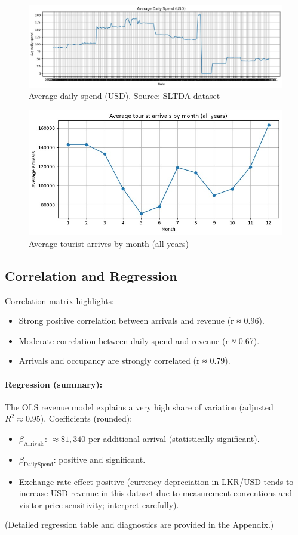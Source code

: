 \documentclass[12pt,a4paper]{article}
\begin{document}
\begin{figure}[H]
  \centering
  \includegraphics[width=0.9\linewidth]{figure3.jpg}
  \caption{Average daily spend (USD). Source: SLTDA dataset}
\end{figure}

\begin{figure}[H]
  \centering
  \includegraphics[width=0.9\linewidth]{figure4.jpg}
  \caption{Average tourist arrives by month (all years)}
\end{figure}

\subsection{Correlation and Regression}
Correlation matrix highlights:
\begin{itemize}
  \item Strong positive correlation between arrivals and revenue (r ≈ 0.96).
  \item Moderate correlation between daily spend and revenue (r ≈ 0.67).
  \item Arrivals and occupancy are strongly correlated (r ≈ 0.79).
\end{itemize}

\paragraph{Regression (summary):}
The OLS revenue model explains a very high share of variation (adjusted \(R^2 \approx 0.95\)). Coefficients (rounded):
\begin{itemize}
  \item \(\beta_{\text{Arrivals}}\): \(\approx\$1{,}340\) per additional arrival (statistically significant).
  \item \(\beta_{\text{DailySpend}}\): positive and significant.
  \item Exchange-rate effect positive (currency depreciation in LKR/USD tends to increase USD revenue in this dataset due to measurement conventions and visitor price sensitivity; interpret carefully).
\end{itemize}
(Detailed regression table and diagnostics are provided in the Appendix.)
\end{document}

